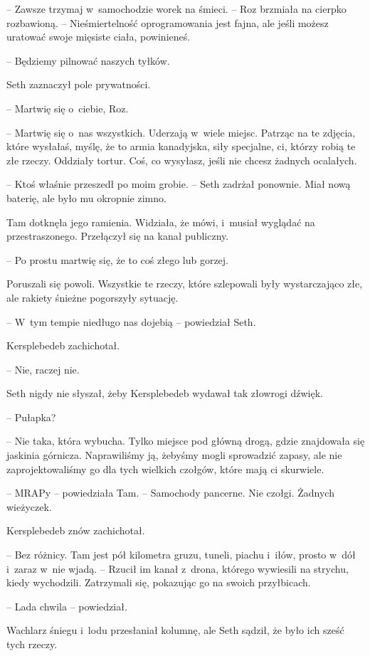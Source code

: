 \documentclass[oneside,polish,11pt,sfheadings]{mwbk}
\begin{document}
-- Zawsze trzymaj w~samochodzie worek na śmieci. -- Roz brzmiała na
cierpko rozbawioną. -- Nieśmiertelność oprogramowania jest fajna, ale
jeśli możesz uratować swoje mięsiste ciała, powinieneś.

-- Będziemy pilnować naszych tyłków.

Seth zaznaczył pole prywatności. 

-- Martwię się o~ciebie, Roz.

-- Martwię się o~nas wszystkich. Uderzają w~wiele miejsc. Patrząc na te
zdjęcia, które wysłałaś, myślę, że to armia kanadyjska, siły specjalne,
ci, którzy robią te złe rzeczy. Oddziały tortur. Coś, co wysyłasz, jeśli
nie chcesz żadnych ocalałych.

-- Ktoś właśnie przeszedł po moim grobie. -- Seth zadrżał ponownie. Miał
nową baterię, ale było mu okropnie zimno.

Tam dotknęła jego ramienia. Widziała, że mówi, i~musiał wyglądać na
przestraszonego. Przełączył się na kanał publiczny.

-- Po prostu martwię się, że to coś złego lub gorzej.

Poruszali się powoli. Wszystkie te rzeczy, które szlepowali były
wystarczająco złe, ale rakiety śnieżne pogorszyły sytuację.

-- W~tym tempie niedługo nas dojebią -- powiedział Seth.

Kersplebedeb zachichotał. 

-- Nie, raczej nie.

Seth nigdy nie słyszał, żeby Kersplebedeb wydawał tak złowrogi dźwięk.

-- Pułapka?

-- Nie taka, która wybucha. Tylko miejsce pod główną drogą, gdzie
znajdowała się jaskinia górnicza. Naprawiliśmy ją, żebyśmy mogli
sprowadzić zapasy, ale nie zaprojektowaliśmy go dla tych wielkich
czołgów, które mają ci skurwiele.

-- MRAPy -- powiedziała Tam. -- Samochody pancerne. Nie czołgi. Żadnych
wieżyczek.

Kersplebedeb znów zachichotał. 

-- Bez różnicy. Tam jest pół kilometra
gruzu, tuneli, piachu i~iłów, prosto w~dół i~zaraz w~nie wjadą. -- Rzucił
im kanał z~drona, którego wywiesili na strychu, kiedy wychodzili.
Zatrzymali się, pokazując go na swoich przyłbicach. 

-- Lada chwila -- powiedział.

Wachlarz śniegu i~lodu przesłaniał kolumnę, ale Seth sądził, że było ich
sześć tych rzeczy.
\end{document}
